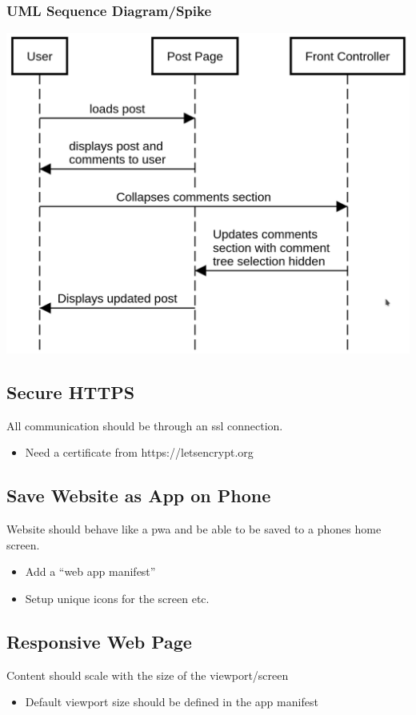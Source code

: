 \documentclass[12pt]{article}
\begin{document}
\subsubsection{UML Sequence Diagram/Spike}
\includegraphics[scale=0.5]{img/collapse_post_responses.png}\linebreak

\subsection{Secure HTTPS}
All communication should be through an ssl connection.
\begin{itemize}
  \item Need a certificate from https://letsencrypt.org
\end{itemize}

\subsection{Save Website as App on Phone}
Website should behave like a pwa and be able to be saved to a phones home screen.
\begin{itemize}
  \item Add a “web app manifest”
  \item Setup unique icons for the screen etc.
\end{itemize}

\subsection{Responsive Web Page}
Content should scale with the size of the viewport/screen
\begin{itemize}
  \item Default viewport size should be defined in the app manifest
\end{itemize}
\end{document}
